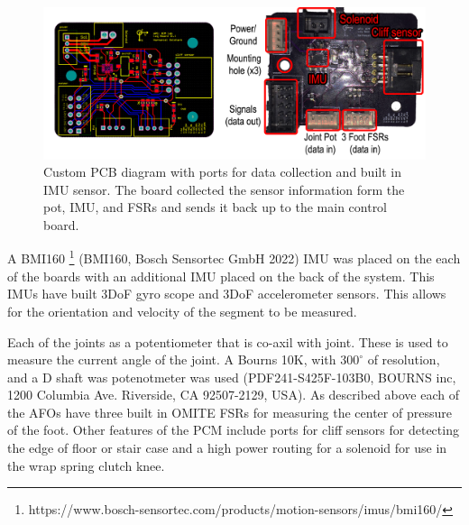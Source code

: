 \begin{figure}
    \centering
    \includegraphics[scale=0.23]{images/mech_design/IMU_diagram.png}
    \caption[Custom PCB Diagram]{Custom PCB diagram with ports for data collection and built in IMU sensor. The board collected the sensor information form the pot, IMU, and FSRs and sends it back up to the main control board.}
    \label{fig:imu_circut}
\end{figure}

A BMI160 \footnote{https://www.bosch-sensortec.com/products/motion-sensors/imus/bmi160/} (BMI160, Bosch Sensortec GmbH 2022) IMU was placed on the each of the boards with an additional IMU placed on the back of the system. This IMUs have built 3DoF gyro scope and 3DoF accelerometer sensors. This allows for the orientation and velocity of the segment to be measured. 

Each of the joints as a potentiometer that is co-axil with joint. These is used to measure the current angle of the joint. A Bourns 10K, with $300^{\circ}$ of resolution, and a D shaft was potenotmeter was used (PDF241-S425F-103B0, BOURNS inc, 1200 Columbia Ave. Riverside, CA 92507-2129, USA). As described above each of the AFOs have three built in OMITE FSRs for measuring the center of pressure of the foot. Other features of the PCM include ports for cliff sensors for detecting the edge of floor or stair case and a high power routing for a solenoid for use in the wrap spring clutch knee. 


